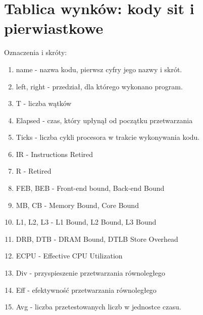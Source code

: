 \documentclass[12pt]{article}
\begin{document}
\section{Tablica wynków: kody sit i pierwiastkowe}
Oznaczenia i skróty:
\begin{enumerate}
	\item name - nazwa kodu, pierwsz cyfry jego nazwy i skrót.
	\item left, right - przedział, dla którego wykonano program.
	\item T - liczba wątków
	\item Elapsed - czas, który upłynął od początku przetwarzania
	\item Ticks - liczba cykli procesora w trakcie wykonywania kodu.
	\item IR - Instructions Retired
	\item R - Retired
	\item FEB, BEB - Front-end bound, Back-end Bound
	\item MB, CB - Memory Bound,  Core Bound
	\item L1, L2, L3 - L1 Bound, L2 Bound, L3 Bound
	\item DRB, DTB - DRAM Bound, DTLB Store Overhead
	\item ECPU - Effective CPU Utilization
	\item Div - przyspieszenie przetwarzania równoległego
	\item Eff - efektywność przetwarzania równoległego
	\item Avg - liczba przetestowanych liczb w jednostce czasu.
\end{enumerate}
\end{document}
